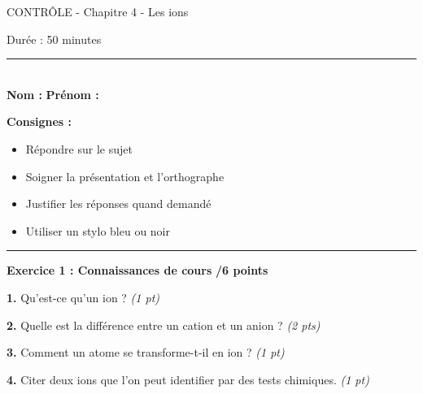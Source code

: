 \documentclass[11pt,a4paper]{article}
\newcommand{\cadreblanc}[1]{%
	\medskip\framebox[\linewidth][c]{%
		\rule{0mm}{#1mm}}\par
	\medskip}
\begin{document}
	
	\begin{center}
		\LARGE{CONTRÔLE - Chapitre 4 - Les ions}
		
		\vspace{3mm}
		
		\large{Durée : 50 minutes}
		
	\end{center}
	
	\normalsize
	
	\hrule\
	\\[0,2cm]
	
	\textbf{Nom :} \dotfill \hspace{2cm} \textbf{Prénom :} \dotfill
	
	\vspace{3mm}
	
	\begin{tcolorbox}[colback=blue!5!white,colframe=blue!75!black]
		{
			\textbf{Consignes :}
			\begin{itemize}
				\item Répondre sur le sujet
				\item Soigner la présentation et l'orthographe
				\item Justifier les réponses quand demandé
				\item Utiliser un stylo bleu ou noir
			\end{itemize}
		}
	\end{tcolorbox}
	
	\vspace{5mm}
	
	\hrule
	\vspace{3mm}
	
	\textbf{Exercice 1 : Connaissances de cours} \hfill \textbf{/6 points}
	
	\vspace{3mm}
	
	\textbf{1.} Qu'est-ce qu'un ion ? \hfill \textit{(1 pt)}
	
	\cadreblanc{15}
	
	\textbf{2.} Quelle est la différence entre un cation et un anion ? \hfill \textit{(2 pts)}
	
	\cadreblanc{20}
	
	\textbf{3.} Comment un atome se transforme-t-il en ion ? \hfill \textit{(1 pt)}
	
	\cadreblanc{15}
	
	\textbf{4.} Citer deux ions que l'on peut identifier par des tests chimiques. \hfill \textit{(1 pt)}
	
	\cadreblanc{12}
	
\end{document}
